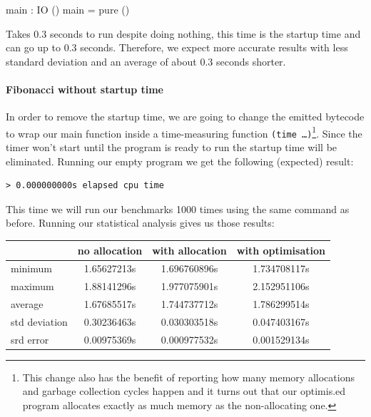 \documentclass[
]{article}
\newenvironment{Shaded}{}{}
\newcommand{\DataTypeTok}[1]{\textcolor[rgb]{0.56,0.13,0.00}{#1}}
\newcommand{\FunctionTok}[1]{\textcolor[rgb]{0.02,0.16,0.49}{#1}}
\newcommand{\NormalTok}[1]{#1}
\newcommand{\OperatorTok}[1]{\textcolor[rgb]{0.40,0.40,0.40}{#1}}
\newcommand{\OtherTok}[1]{\textcolor[rgb]{0.00,0.44,0.13}{#1}}
\begin{document}
\begin{Shaded}
\begin{Highlighting}[]
\NormalTok{main }\OperatorTok{:} \DataTypeTok{IO}\NormalTok{ ()}
\NormalTok{main }\OtherTok{=} \FunctionTok{pure}\NormalTok{ ()}
\end{Highlighting}
\end{Shaded}

Takes 0.3 seconds to run despite doing nothing, this time is the startup
time and can go up to 0.3 seconds. Therefore, we expect more accurate
results with less standard deviation and an average of about 0.3 seconds
shorter.

\hypertarget{fibonacci-without-startup-time}{%
\paragraph{Fibonacci without startup
time}\label{fibonacci-without-startup-time}}

In order to remove the startup time, we are going to change the emitted
bytecode to wrap our main function inside a time-measuring function
\texttt{(time\ \ldots{})}\footnote{This change also has the benefit of
  reporting how many memory allocations and garbage collection cycles
  happen and it turns out that our optimis.ed program allocates exactly
  as much memory as the non-allocating one.}. Since the timer won't
start until the program is ready to run the startup time will be
eliminated. Running our empty program we get the following (expected)
result:

\begin{verbatim}
> 0.000000000s elapsed cpu time
\end{verbatim}

This time we will run our benchmarks 1000 times using the same command
as before. Running our statistical analysis gives us those results:

\begin{tabular}{ l | c c c }
          & no allocation & with allocation & with optimisation\\
\hline 
  minimum       & 1.65627213s & 1.696760896s & 1.734708117s \\
  maximum       & 1.88141296s & 1.977075901s & 2.152951106s \\ 
  average       & 1.67685517s & 1.744737712s & 1.786299514s  \\
  std deviation & 0.30236463s & 0.030303518s & 0.047403167s \\
  srd error     & 0.00975369s & 0.000977532s & 0.001529134s \\
\end{tabular}
\end{document}

